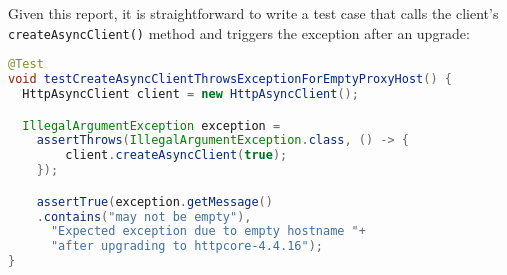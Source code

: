 Given this report, it is straightforward to write a test case that calls the client's \texttt{createAsyncClient()} method
and triggers the exception after an upgrade:
\newpage
\begin{lstlisting}[language=Java,basicstyle=\scriptsize\ttfamily]
@Test
void testCreateAsyncClientThrowsExceptionForEmptyProxyHost() {
  HttpAsyncClient client = new HttpAsyncClient();

  IllegalArgumentException exception =
    assertThrows(IllegalArgumentException.class, () -> {
        client.createAsyncClient(true);
    });

    assertTrue(exception.getMessage()
    .contains("may not be empty"),
      "Expected exception due to empty hostname "+
      "after upgrading to httpcore-4.4.16");
}
\end{lstlisting}
